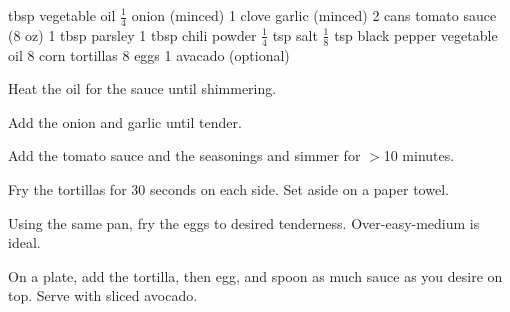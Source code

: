 \dishtype{}
\begin{ingreds}
     tbsp vegetable oil
        $\frac{1}{4}$ onion (minced)
        1 clove garlic (minced)
        2 cans tomato sauce (8 oz)
        1 tbsp parsley
        1 tbsp chili powder
        $\frac{1}{4}$ tsp salt
        $\frac{1}{8}$ tsp black pepper
    \columnbreak{}
    vegetable oil
    8 corn tortillas
    8 eggs
    1 avacado (optional)
\end{ingreds}
\begin{method}
    Heat the oil for the sauce until shimmering.\par
    Add the onion and garlic until tender.\par
    Add the tomato sauce and the seasonings and simmer for $>$10 minutes.\par
    Fry the tortillas for 30 seconds on each side. Set aside on a paper towel.\par
    Using the same pan, fry the eggs to desired tenderness. Over-easy-medium is ideal.\par
    On a plate, add the tortilla, then egg, and spoon as much sauce as you desire on top. Serve with sliced avocado.
\end{method}